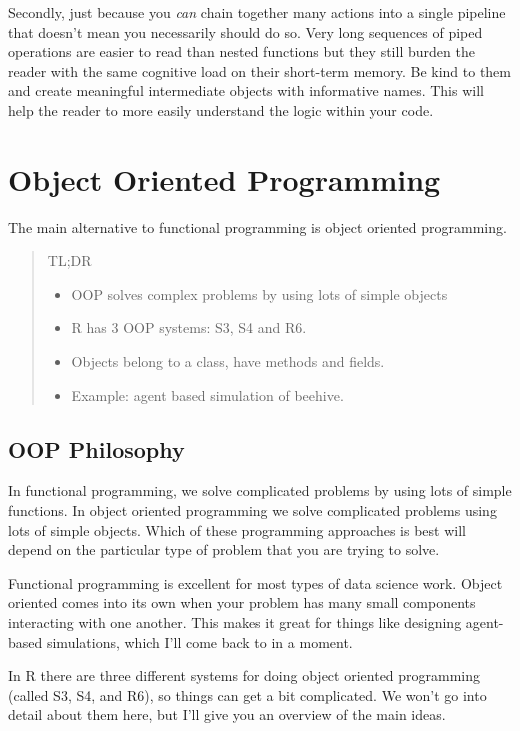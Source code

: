 \documentclass[
  letterpaper,
  DIV=11,
  numbers=noendperiod]{scrreprt}
\providecommand{\tightlist}{%
  \setlength{\itemsep}{0pt}\setlength{\parskip}{0pt}}\usepackage{longtable,booktabs,array}
\begin{document}
Secondly, just because you \emph{can} chain together many actions into a
single pipeline that doesn't mean you necessarily should do so. Very
long sequences of piped operations are easier to read than nested
functions but they still burden the reader with the same cognitive load
on their short-term memory. Be kind to them and create meaningful
intermediate objects with informative names. This will help the reader
to more easily understand the logic within your code.

\section{Object Oriented Programming}\label{object-oriented-programming}

The main alternative to functional programming is object oriented
programming.

\begin{quote}
TL;DR

\begin{itemize}
\tightlist
\item
  OOP solves complex problems by using lots of simple objects
\item
  R has 3 OOP systems: S3, S4 and R6.
\item
  Objects belong to a class, have methods and fields.
\item
  Example: agent based simulation of beehive.
\end{itemize}
\end{quote}

\subsection{OOP Philosophy}\label{oop-philosophy}

In functional programming, we solve complicated problems by using lots
of simple functions. In object oriented programming we solve complicated
problems using lots of simple objects. Which of these programming
approaches is best will depend on the particular type of problem that
you are trying to solve.

Functional programming is excellent for most types of data science work.
Object oriented comes into its own when your problem has many small
components interacting with one another. This makes it great for things
like designing agent-based simulations, which I'll come back to in a
moment.

In R there are three different systems for doing object oriented
programming (called S3, S4, and R6), so things can get a bit
complicated. We won't go into detail about them here, but I'll give you
an overview of the main ideas.
\end{document}
